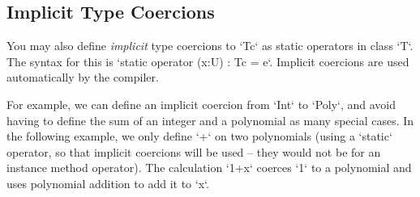 

\subsection{Implicit Type Coercions}

You may also define {\em implicit} type coercions to \xcd`T{c}` as static
operators in class \xcd`T`.  The syntax for this is
\xcd`static operator (x:U) : T{c} = e`.
Implicit coercions are used automatically by the compiler.  

For example, we can define an implicit coercion from \xcd`Int` to \xcd`Poly`,
and avoid having to define the sum of an integer and a polynomial
as many special cases.  In the following example, we only define \xcd`+` on
two polynomials (using a \xcd`static` operator, so that implicit coercions
will be used -- they would not be for an instance method operator).  The
calculation \xcd`1+x` coerces \xcd`1` to a polynomial and uses polynomial
addition to add it to \xcd`x`.

